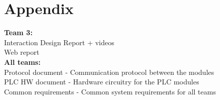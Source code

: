 \chapter{Appendix}
\textbf{Team 3:}
\\Interaction Design Report + videos
\\Web report
\\\textbf{All teams:}
\\Protocol document - Communication protocol between the modules
\\PLC HW document - Hardware circuitry for the PLC modules
\\Common requirements - Common system requirements for all teams